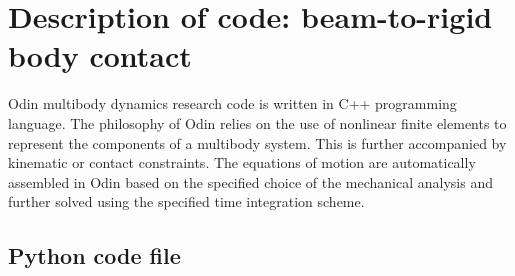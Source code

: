 \section{Description of code: beam-to-rigid body contact}
Odin multibody dynamics research code \cite{odin2022} is written in C++ programming language. The philosophy of Odin relies on the use of nonlinear finite elements to represent the components of a multibody system. This is further accompanied by kinematic or contact constraints. The equations of motion are automatically assembled in Odin based on the specified choice of the mechanical analysis and further solved using the specified time integration scheme.\\

\subsection{Python code file} 
